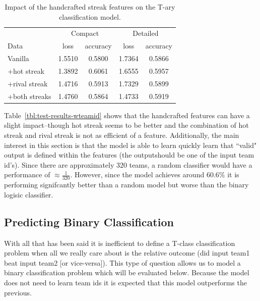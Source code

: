 \documentclass{article} %
\begin{document}
\begin{table}
\centering
  \begin{tabular}{|l|c|c|c|c|}
  \hline
   & \multicolumn{2}{|c|}{Compact} & \multicolumn{2}{|c|}{Detailed}\\
  Data & loss & accuracy & loss & accuracy\\
  \hline
  Vanilla       & 1.5510 & 0.5800 & 1.7364 & 0.5866\\ 
  +hot streak   & 1.3892 & 0.6061 & 1.6555 & 0.5957\\
  +rival streak & 1.4716 & 0.5913 & 1.7329 & 0.5899\\
  +both streaks & 1.4760 & 0.5864 & 1.4733 & 0.5919\\
  \hline
  \end{tabular}
  \caption{Impact of the handcrafted streak features on the T-ary classification model.}
\end{table}
\label{tbl:test-results-wteamid}

Table~\ref{tbl:test-results-wteamid} shows that the handcrafted features can have a slight impact--though hot streak seems to be better and the combination of hot streak and rival streak is not as efficient of a feature.
Additionally, the main interest in this section is that the model is able to learn quickly learn that ``valid" output is defined within the features (the outputshould be one of the input team id's).
Since there are approximately 320 teams, a random classifier would have a performance of $\approx \frac{1}{320}$.
However, since the model achieves around $60.6\%$ it is performing signifcantly better than a random model but worse than the binary logisic classifier.




\subsection{Predicting Binary Classification}
\label{sec:results-symmetrical}

With all that has been said it is inefficient to define a T-class classification problem when all we really care about is the relative outcome (did input team1 beat input team2 [or vice-versa]).
This type of question allows us to model a binary classification problem which will be evaluated below.
Because the model does not need to learn team ids it is expected that this model outperforms the previous.
\end{document}
